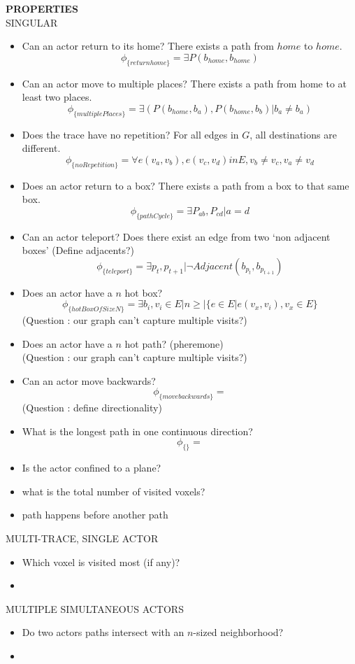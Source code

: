 \documentclass{article}
\begin{document}
\newpage
\textbf{PROPERTIES}\\
SINGULAR\\
\begin{itemize}
\item Can an actor return to its home?  There exists a path from $home$ to $home$.  
  $$\phi_{\{returnhome\}} = \exists P(b_{home}, b_{home})$$
\item Can an actor move to multiple places? There exists a path from home to at least two places.
  $$\phi_{\{multiplePlaces\}} = \exists (P(b_{home}, b_a), P(b_{home}, b_b)| b_a \neq b_a)$$

\item Does the trace have no repetition? For all edges in $G$, all destinations are different.
  $$\phi_{\{noRepetition\}} = \forall e(v_a, v_b), e(v_c,v_d) in E, v_b \neq v_c, v_a \neq v_d$$

\item Does an actor return to a box? There exists a path from a box to that same box.
  $$\phi_{\{pathCycle\}} = \exists P_{ab}, P_{cd} | a = d$$
\item Can an actor teleport? Does there exist an edge from two `non adjacent boxes'  (Define adjacents?)
  $$\phi_{\{teleport\}} = \exists  p_t, p_{t+1} | \lnot Adjacent(b_{p_t}, b_{p_{t+1}})$$
\item Does an actor have a $n$ hot box? 
  $$\phi_{\{hotBoxOfSizeN\}} = \exists b_i, v_i \in E | n \geq |\{e \in E | e(v_x, v_i), v_x \in E\}$$
  (Question : our graph can't capture multiple visits?)
\item Does an actor have a $n$ hot path? (pheremone)\\
  (Question : our graph can't capture multiple visits?)
\item Can an actor move backwards?
  $$\phi_{\{movebackwards\}} = $$
  (Question : define directionality)
\item What is the longest path in one continuous direction?
  $$\phi_{\{\}} = $$
\item Is the actor confined to a plane?
\item what is the total number of visited voxels?
\item path happens before another path
\end{itemize}

MULTI-TRACE, SINGLE ACTOR\\
\begin{itemize}
  \item Which voxel is visited most (if any)?
  \item 
\end{itemize}

MULTIPLE SIMULTANEOUS ACTORS\\
\begin{itemize}
  \item Do two actors paths intersect with an $n$-sized neighborhood?
  \item 
\end{itemize}

\end{document}
